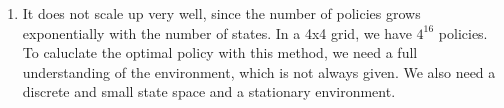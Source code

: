 \documentclass[12pt]{scrartcl}
\begin{document}
\begin{enumerate}
            \[
            \pi_1 =
            \begin{bmatrix}
            1 & 2 & 2 \\
            3 & 3 & 2 \\
            0 & 0 & 0
            \end{bmatrix}
            \quad
            \pi_2 =
            \begin{bmatrix}
            2 & 2 & 2 \\
            3 & 3 & 2 \\
            0 & 0 & 0
            \end{bmatrix}
            \]

            \textbf{Interpretation:}

            In most states, the optimal action is \textbf{RIGHT (2)} or \textbf{UP (3)} depending on the position.
            \textbf{DOWN (1)} is more dangerous than \textbf{RIGHT (2)}, since it can move us close to the hole.
            \textbf{RIGHT (2)} is therefore the most safe option and due to the rules of the game, it can also move us \textbf{DOWN (1)}, i. e. towards the goal.
      \item It does not scale up very well, since the number of policies grows exponentially with the number of states. In a 4x4 grid, we have $4^{16}$ policies.\\
            To caluclate the optimal policy with this method, we need a full understanding of the environment, which is not always given. We also need a discrete and small state space and a stationary environment.
\end{enumerate}
\end{document}
